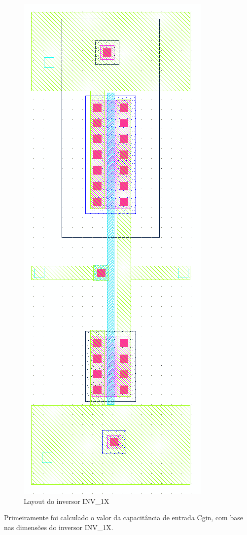 \documentclass[a4paper,10pt] {article}
\begin{document}
\begin{figure}[h]
	\centering
	\includegraphics[scale=0.3]{layout_inversor.png}
	\caption{Layout do inversor INV\_1X}
	\label{fig:inv}
\end{figure}

Primeiramente foi calculado o valor da capacitância de entrada Cgin, com base nas dimensões do inversor INV\_1X.
\end{document}
